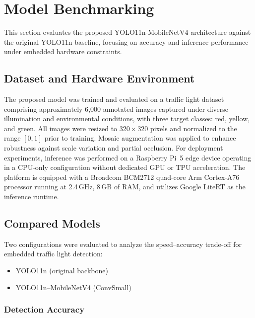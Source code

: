 \section{Model Benchmarking}
\label{sec:comparison}

This section evaluates the proposed YOLO11n-MobileNetV4 architecture against the original YOLO11n baseline, focusing on accuracy and inference performance under embedded hardware constraints.

\subsection{Dataset and Hardware Environment}
The proposed model was trained and evaluated on a traffic light dataset comprising approximately 6{,}000 annotated images captured under diverse illumination and environmental conditions, with three target classes: red, yellow, and green. All images were resized to $320 \times 320$ pixels and normalized to the range $[0,1]$ prior to training. Mosaic augmentation was applied to enhance robustness against scale variation and partial occlusion. For deployment experiments, inference was performed on a Raspberry Pi~5 edge device operating in a CPU-only configuration without dedicated GPU or TPU acceleration. The platform is equipped with a Broadcom BCM2712 quad-core Arm Cortex-A76 processor running at 2.4\,GHz, 8\,GB of RAM, and utilizes Google LiteRT as the inference runtime.

\subsection{Compared Models}
Two configurations were evaluated to analyze the speed--accuracy trade-off for embedded traffic light detection:
\begin{itemize}
    \item YOLO11n (original backbone)
    \item YOLO11n--MobileNetV4 (ConvSmall)
\end{itemize}
\subsubsection{Detection Accuracy} 



